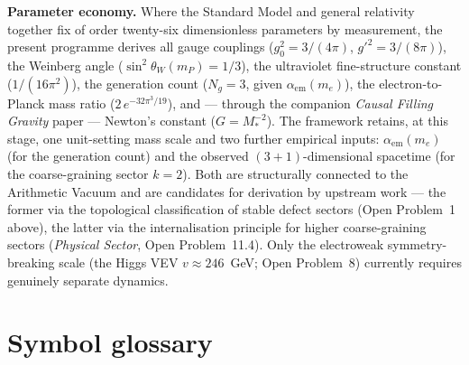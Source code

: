 \documentclass[12pt]{article}
\theoremstyle{definition}
\theoremstyle{remark}
\begin{document}
\medskip
\textbf{Parameter economy.}  Where the Standard Model and general relativity
together fix of order twenty-six dimensionless parameters by measurement, the
present programme derives all gauge couplings ($g_0^2=3/(4\pi)$,
$g'^2=3/(8\pi)$), the Weinberg angle ($\sin^2\theta_W(m_P)=1/3$), the
ultraviolet fine-structure constant ($1/(16\pi^2)$), the generation count
($N_g=3$, given $\alpha_{\mathrm{em}}(m_e)$), the electron-to-Planck mass
ratio ($2\,e^{-32\pi^3/19}$), and --- through the companion
\emph{Causal Filling Gravity} paper --- Newton's constant ($G=M_*^{-2}$).
The framework retains, at this stage, one unit-setting mass scale and two
further empirical inputs: $\alpha_{\mathrm{em}}(m_e)$ (for the generation
count) and the observed $(3{+}1)$-dimensional spacetime (for the
coarse-graining sector $k=2$).  Both are structurally connected to the
Arithmetic Vacuum and are candidates for derivation by upstream work --- the
former via the topological classification of stable defect sectors
(Open Problem~1 above), the latter via the internalisation principle for
higher coarse-graining sectors (\emph{Physical Sector}, Open Problem~11.4).
Only the electroweak symmetry-breaking scale (the Higgs VEV $v\approx246$~GeV;
Open Problem~8) currently requires genuinely separate dynamics.

\appendix
\section{Symbol glossary}
\end{document}
